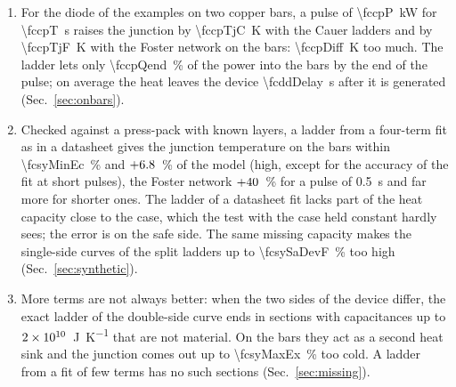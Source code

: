 \documentclass[10pt,a4paper]{scrartcl}
\newcommand{\JK}{\si{\joule\per\kelvin}}
\begin{document}
\begin{enumerate}
\item For the diode of the examples on two copper bars, a pulse of \SI{\fccpP}{\kilo\watt} for \SI{\fccpT}{\second} raises the junction by \SI{\fccpTjC}{\kelvin} with the Cauer ladders and by \SI{\fccpTjF}{\kelvin} with the Foster network on the bars: \SI{\fccpDiff}{\kelvin} too much. The ladder lets only \SI{\fccpQend}{\percent} of the power into the bars by the end of the pulse; on average the heat leaves the device \SI{\fcddDelay}{\second} after it is generated (Sec.~\ref{sec:onbars}).
\item Checked against a press-pack with known layers, a ladder from a four-term fit as in a datasheet gives the junction temperature on the bars within \SI{\fcsyMinEc}{\percent} and $+6.8$~\% of the model (high, except for the accuracy of the fit at short pulses), the Foster network $+40$~\% for a pulse of \SI{0.5}{\second} and far more for shorter ones. The ladder of a datasheet fit lacks part of the heat capacity close to the case, which the test with the case held constant hardly sees; the error is on the safe side. The same missing capacity makes the single-side curves of the split ladders up to \SI{\fcsySaDevF}{\percent} too high (Sec.~\ref{sec:synthetic}).
\item More terms are not always better: when the two sides of the device differ, the exact ladder of the double-side curve ends in sections with capacitances up to $2\times 10^{10}$~\JK{} that are not material. On the bars they act as a second heat sink and the junction comes out up to \SI{\fcsyMaxEx}{\percent} too cold. A ladder from a fit of few terms has no such sections (Sec.~\ref{sec:missing}).
\end{enumerate}

\end{document}
